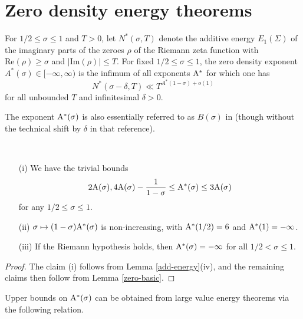 \chapter{Zero density energy theorems}\label{zero-density-energy-chapter}


\begin{definition}\label{zeroe-def}  For $1/2 \leq \sigma \leq 1$ and $T>0$, let $N^*(\sigma,T)$ denote the additive energy $E_1(\Sigma)$ of the imaginary parts of the zeroes $\rho$ of the Riemann zeta function with $\mathrm{Re}(\rho) \geq \sigma$ and $|\mathrm{Im}(\rho)| \leq T$.  For fixed $1/2 \leq \sigma \leq 1$, the zero density exponent $A^*(\sigma) \in [-\infty,\infty)$ is the infimum of all exponents $\mathrm{A}^*$ for which one has
    $$ N^*(\sigma-\delta,T) \ll T^{A^* (1-\sigma)+o(1)}$$
for all unbounded $T$ and infinitesimal $\delta>0$.
\end{definition}

The exponent $\mathrm{A}^*(\sigma)$ is also essentially referred to as $B(\sigma)$ in \cite{heath_brown_consecutive_II} (though without the technical shift by $\delta$ in that reference).


\begin{lemma}\label{zeroe-basic}\
\begin{itemize}
\item[(i)] We have the trivial bounds
$$ 2\mathrm{A}(\sigma), 4\mathrm{A}(\sigma)-\frac{1}{1-\sigma} \leq \mathrm{A}^*(\sigma) \leq 3 \mathrm{A}(\sigma)$$
for any $1/2 \leq \sigma \leq 1$.
\item[(ii)] $\sigma \mapsto (1-\sigma) \mathrm{A}^*(\sigma)$ is non-increasing, with $\mathrm{A}^*(1/2)=6$ and $\mathrm{A}^*(1)=-\infty$.
\item[(iii)] If the Riemann hypothesis holds, then $\mathrm{A}^*(\sigma)=-\infty$ for all $1/2 < \sigma \leq 1$.
\end{itemize}
\end{lemma}


\begin{proof} The claim (i) follows from Lemma \ref{add-energy}(iv), and the remaining claims then follow from Lemma \ref{zero-basic}.\end{proof}

Upper bounds on $\mathrm{A}^*(\sigma)$ can be obtained from large value energy theorems via the following relation.

